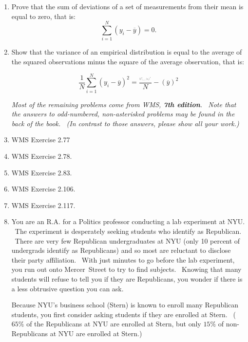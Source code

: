 \documentclass[11pt]{article}
\begin{document}
\begin{enumerate}
\item Prove that the sum of deviations of a set of measurements from their
mean is equal to zero, that is:%
\begin{equation*}
\underset{i=1}{\overset{N}{\sum }}\left( y_{i}-\overline{y}\right) =0.
\end{equation*}%
\bigskip 

\item Show that the variance of an empirical distribution is equal to the
average of the squared observations minus the square of the average
observation, that is:

\begin{equation*}
\frac{1}{N}\underset{i=1}{\overset{N}{\sum }}\left( y_{i}-\overline{y}%
\right) ^{2}=\frac{_{_{^{^{\underset{i=1}{\overset{N}{\sum }}\left(
y_{i}\right) ^{2}}}}}}{N}-\left( \overline{y}\right) ^{2}
\end{equation*}%
\bigskip 

\textit{Most of the remaining problems come from WMS, \textbf{7th edition}.
\ Note that the answers to odd-numbered, non-asterisked problems may be
found in the back of the book. \ (In contrast to those answers, please show
all your work.)}\bigskip 

\item WMS Exercise 2.77 

\item WMS Exercise 2.78.

\item WMS Exercise 2.83.

\item WMS Exercise 2.106.

\item WMS Exercise 2.117.

\item You are an R.A. for a Politics professor conducting a lab experiment
at NYU. \ The experiment is desperately seeking students who identify as
Republican. \ There are very few Republican undergraduates at NYU (only 10
percent of undergrads identify as Republicans) and so most are reluctant to
disclose their party affiliation. \ With just minutes to go before the lab
experiment, you run out onto Mercer\ Street to try to find subjects. \
Knowing that many students will refuse to tell you if they are Republicans,
you wonder if there is a less obtrusive question you can ask. \ \bigskip 

Because NYU's business school (Stern) is known to enroll many Republican
students, you first consider asking students if they are enrolled at Stern.
\ ($65\%$ of the Republicans at NYU are enrolled at Stern, but only $15\%$
of non-Republicans at NYU are enrolled at Stern.) \bigskip 


\end{enumerate}
\end{document}
